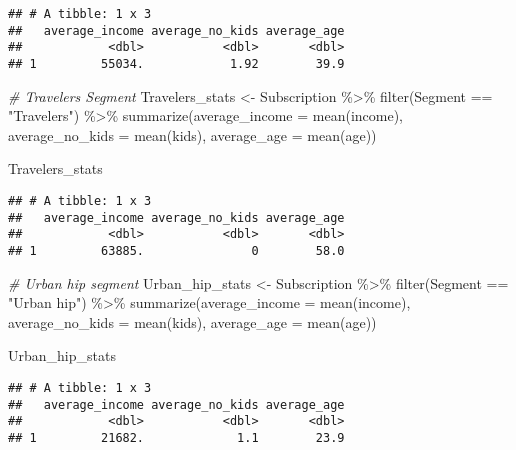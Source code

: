 \documentclass[
]{article}
\newenvironment{Shaded}{\begin{snugshade}}{\end{snugshade}}
\newcommand{\AttributeTok}[1]{\textcolor[rgb]{0.77,0.63,0.00}{#1}}
\newcommand{\CommentTok}[1]{\textcolor[rgb]{0.56,0.35,0.01}{\textit{#1}}}
\newcommand{\FunctionTok}[1]{\textcolor[rgb]{0.00,0.00,0.00}{#1}}
\newcommand{\NormalTok}[1]{#1}
\newcommand{\OtherTok}[1]{\textcolor[rgb]{0.56,0.35,0.01}{#1}}
\newcommand{\SpecialCharTok}[1]{\textcolor[rgb]{0.00,0.00,0.00}{#1}}
\newcommand{\StringTok}[1]{\textcolor[rgb]{0.31,0.60,0.02}{#1}}
\begin{document}
\begin{verbatim}
## # A tibble: 1 x 3
##   average_income average_no_kids average_age
##            <dbl>           <dbl>       <dbl>
## 1         55034.            1.92        39.9
\end{verbatim}

\begin{Shaded}
\begin{Highlighting}[]
\CommentTok{\# Travelers Segment}
\NormalTok{Travelers\_stats }\OtherTok{\textless{}{-}}\NormalTok{ Subscription }\SpecialCharTok{\%\textgreater{}\%}
  \FunctionTok{filter}\NormalTok{(Segment }\SpecialCharTok{==} \StringTok{"Travelers"}\NormalTok{) }\SpecialCharTok{\%\textgreater{}\%}
  \FunctionTok{summarize}\NormalTok{(}\AttributeTok{average\_income =} \FunctionTok{mean}\NormalTok{(income), }\AttributeTok{average\_no\_kids =} \FunctionTok{mean}\NormalTok{(kids), }
            \AttributeTok{average\_age =} \FunctionTok{mean}\NormalTok{(age))}

\NormalTok{Travelers\_stats}
\end{Highlighting}
\end{Shaded}

\begin{verbatim}
## # A tibble: 1 x 3
##   average_income average_no_kids average_age
##            <dbl>           <dbl>       <dbl>
## 1         63885.               0        58.0
\end{verbatim}

\begin{Shaded}
\begin{Highlighting}[]
\CommentTok{\# Urban hip segment}
\NormalTok{Urban\_hip\_stats }\OtherTok{\textless{}{-}}\NormalTok{ Subscription }\SpecialCharTok{\%\textgreater{}\%}
  \FunctionTok{filter}\NormalTok{(Segment }\SpecialCharTok{==} \StringTok{"Urban hip"}\NormalTok{) }\SpecialCharTok{\%\textgreater{}\%}
  \FunctionTok{summarize}\NormalTok{(}\AttributeTok{average\_income =} \FunctionTok{mean}\NormalTok{(income), }\AttributeTok{average\_no\_kids =} \FunctionTok{mean}\NormalTok{(kids), }
            \AttributeTok{average\_age =} \FunctionTok{mean}\NormalTok{(age))}

\NormalTok{Urban\_hip\_stats}
\end{Highlighting}
\end{Shaded}

\begin{verbatim}
## # A tibble: 1 x 3
##   average_income average_no_kids average_age
##            <dbl>           <dbl>       <dbl>
## 1         21682.             1.1        23.9
\end{verbatim}
\end{document}
